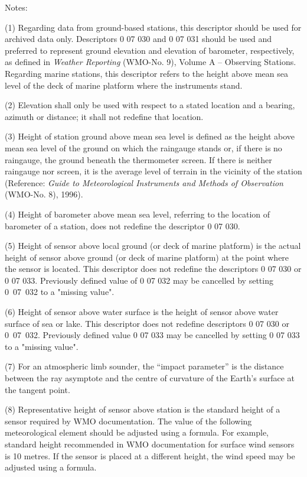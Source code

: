 Notes:

(1) Regarding data from ground-based stations, this descriptor should be used for archived data only. Descriptors 0 07 030 and 0 07 031 should be used and preferred to represent ground elevation and elevation of barometer, respectively, as defined in \emph{Weather Reporting} (WMO-No. 9), Volume A -- Observing Stations. Regarding marine stations, this descriptor refers to the height above mean sea level of the deck of marine platform where the instruments stand.

(2) Elevation shall only be used with respect to a stated location and a bearing, azimuth or distance; it shall not redefine that location.

(3) Height of station ground above mean sea level is defined as the height above mean sea level of the ground on which the raingauge stands or, if there is no raingauge, the ground beneath the thermometer screen. If there is neither raingauge nor screen, it is the average level of terrain in the vicinity of the station (Reference: \emph{Guide to Meteorological Instruments and Methods of Observation} (WMO-No. 8), 1996).

(4) Height of barometer above mean sea level, referring to the location of barometer of a station, does not redefine the descriptor 0 07 030.

(5) Height of sensor above local ground (or deck of marine platform) is the actual height of sensor above ground (or deck of marine platform) at the point where the sensor is located. This descriptor does not redefine the descriptors 0 07 030 or 0 07 033. Previously defined value of 0 07 032 may be cancelled by setting 0~07~032 to a "missing value".

(6) Height of sensor above water surface is the height of sensor above water surface of sea or lake. This descriptor does not redefine descriptors 0 07 030 or 0~07~032. Previously defined value 0 07 033 may be cancelled by setting 0 07 033 to a "missing value".

(7) For an atmospheric limb sounder, the ``impact parameter'' is the distance between the ray asymptote and the centre of curvature of the Earth's surface at the tangent point.

(8) Representative height of sensor above station is the standard height of a sensor required by WMO documentation. The value of the following meteorological element should be adjusted using a formula. For example, standard height recommended in WMO documentation for surface wind sensors is 10 metres. If the sensor is placed at a different height, the wind speed may be adjusted using a formula.

